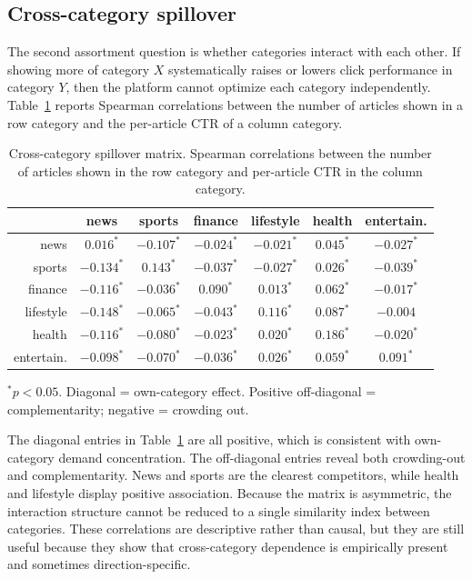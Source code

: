\documentclass[11pt]{article}
\begin{document}
\subsection{Cross-category spillover}

The second assortment question is whether categories interact with each other. If showing more of category $X$ systematically raises or lowers click performance in category $Y$, then the platform cannot optimize each category independently. Table~\ref{tab:spillover} reports Spearman correlations between the number of articles shown in a row category and the per-article CTR of a column category.

\begin{table}[ht]
\centering
\caption{Cross-category spillover matrix. Spearman correlations between the number of articles shown in the row category and per-article CTR in the column category.}
\label{tab:spillover}
\small
\begin{tabular}{r|cccccc}
\toprule
& news & sports & finance & lifestyle & health & entertain. \\
\midrule
news & $0.016^*$ & $-0.107^*$ & $-0.024^*$ & $-0.021^*$ & $0.045^*$ & $-0.027^*$ \\
sports & $-0.134^*$ & $0.143^*$ & $-0.037^*$ & $-0.027^*$ & $0.026^*$ & $-0.039^*$ \\
finance & $-0.116^*$ & $-0.036^*$ & $0.090^*$ & $0.013^*$ & $0.062^*$ & $-0.017^*$ \\
lifestyle & $-0.148^*$ & $-0.065^*$ & $-0.043^*$ & $0.116^*$ & $0.087^*$ & $-0.004$ \\
health & $-0.116^*$ & $-0.080^*$ & $-0.023^*$ & $0.020^*$ & $0.186^*$ & $-0.020^*$ \\
entertain. & $-0.098^*$ & $-0.070^*$ & $-0.036^*$ & $0.026^*$ & $0.059^*$ & $0.091^*$ \\
\bottomrule
\end{tabular}

{\footnotesize $^*p < 0.05$. Diagonal = own-category effect. Positive off-diagonal = complementarity; negative = crowding out.}
\end{table}
\FloatBarrier

The diagonal entries in Table~\ref{tab:spillover} are all positive, which is consistent with own-category demand concentration. The off-diagonal entries reveal both crowding-out and complementarity. News and sports are the clearest competitors, while health and lifestyle display positive association. Because the matrix is asymmetric, the interaction structure cannot be reduced to a single similarity index between categories. These correlations are descriptive rather than causal, but they are still useful because they show that cross-category dependence is empirically present and sometimes direction-specific.
\end{document}
